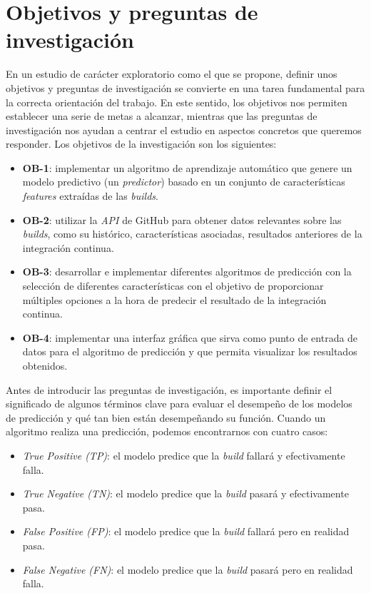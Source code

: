 \section{Objetivos y preguntas de investigación} \label{sec:research_questions}
En un estudio de carácter exploratorio como el que se propone, definir unos objetivos y preguntas
de investigación se convierte en una tarea fundamental para la correcta orientación del trabajo.
En este sentido, los objetivos nos permiten establecer una serie de metas a alcanzar, mientras
que las preguntas de investigación nos ayudan a centrar el estudio en aspectos concretos que
queremos responder. Los objetivos de la investigación son los siguientes:

\begin{itemize}
    \item \textbf{OB-1}: implementar un algoritmo de aprendizaje automático que genere un modelo
          predictivo (un \textit{predictor}) basado en un conjunto de características
          \textit{features} extraídas de las \textit{builds}.\\
    \item \textbf{OB-2}: utilizar la \textit{API} de GitHub para obtener datos relevantes sobre
          las \textit{builds}, como su histórico, características asociadas, resultados anteriores
          de la integración continua.\\
    \item \textbf{OB-3}: desarrollar e implementar diferentes algoritmos de predicción con la
          selección de diferentes características con el objetivo de proporcionar múltiples
          opciones a la hora de predecir el resultado de la integración continua.\\
    \item \textbf{OB-4}: implementar una interfaz gráfica que sirva como punto de entrada de
          datos para el algoritmo de predicción y que permita visualizar los resultados
          obtenidos.
\end{itemize}

Antes de introducir las preguntas de investigación, es importante definir el significado de
algunos términos clave para evaluar el desempeño de los modelos de predicción y qué tan bien
están desempeñando su función. Cuando un algoritmo realiza una predicción, podemos encontrarnos
con cuatro casos:

\begin{itemize}
      \item \textit{True Positive (TP)}: el modelo predice que la \textit{build} fallará y
            efectivamente falla.\\
      \item \textit{True Negative (TN)}: el modelo predice que la \textit{build} pasará y
            efectivamente pasa.\\
      \item \textit{False Positive (FP)}: el modelo predice que la \textit{build} fallará pero
            en realidad pasa.\\
      \item \textit{False Negative (FN)}: el modelo predice que la \textit{build} pasará pero
            en realidad falla.
\end{itemize}


